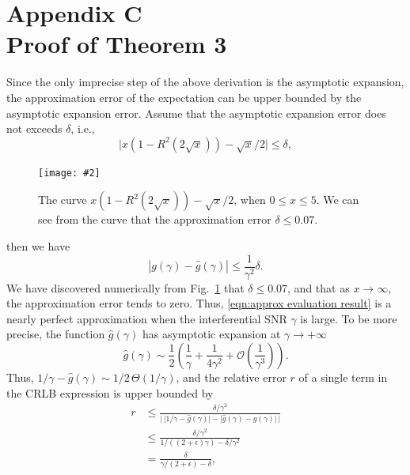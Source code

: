 \documentclass[12pt,draftclsnofoot,journal,onecolumn]{IEEEtran}
\theoremstyle{nonumberplain}
\newcommand{\myincludegraphics}[2][width=12cm]{\texttt{[image: \#2]}}
\begin{document}
\section*{Appendix C\\ Proof of Theorem 3}
    Since the only imprecise step of the above derivation is the asymptotic expansion, the approximation error of the expectation can be upper bounded by the asymptotic expansion error. Assume that the asymptotic expansion error does not exceeds $\delta$, i.e.,
    \begin{equation}
        \lvert x(1-R^2(2\sqrt{x}))-\sqrt{x}/2 \rvert \leq \delta,
        \label{eqn:asymptotic error}
    \end{equation}
    \begin{figure}[ht]
        \centering
        \myincludegraphics{figures/asymptotic_expansion.pdf}
        \caption{The curve $x(1-R^2(2\sqrt{x}))-\sqrt{x}/2$, when $0\leq x\leq 5$. We can see from the curve that the approximation error $\delta \leq 0.07$.}
        \label{fig:asymptotic_expansion}
    \end{figure}
    then we have 
    \begin{equation}
        \left| g(\gamma) - \hat{g}(\gamma)\right| \leq \frac{1}{\gamma^2} \delta. 
    \end{equation}
    We have discovered numerically from Fig.~\ref{fig:asymptotic_expansion} that $\delta \leq 0.07$, and that as $x\to \infty$, the approximation error tends to zero. Thus, \eqref{eqn:approx evaluation result} is a nearly perfect approximation when the interferential SNR $\gamma$ is large. To be more precise, the function $\hat{g}(\gamma)$ has asymptotic expansion at $\gamma \to +\infty$
    \begin{equation}
        \hat{g}(\gamma) \sim \frac{1}{2}\left(\frac{1}{\gamma} + \frac{1}{4\gamma^2} + \mathcal{O}(\frac{1}{\gamma^3})\right).
    \end{equation}
    Thus, $1/\gamma - \hat{g}(\gamma) \sim 1/2\,\Theta(1/\gamma)$, and the relative error $r$ of a single term in the CRLB expression is upper bounded by 
    \begin{equation}
        \begin{aligned}
        r & \leq \frac{\delta/\gamma^2}{\lvert \,\lvert 1/\gamma - \hat{g}(\gamma)\rvert - \lvert \hat{g}(\gamma) -  g(\gamma)\rvert\,\rvert} \\
        & \leq \frac{\delta/\gamma^2}{1/((2+\epsilon)\gamma) - \delta/\gamma^2} \\
        & = \frac{\delta}{\gamma/(2+\epsilon) - \delta}, \\
        \end{aligned}
    \end{equation}
\end{document}
